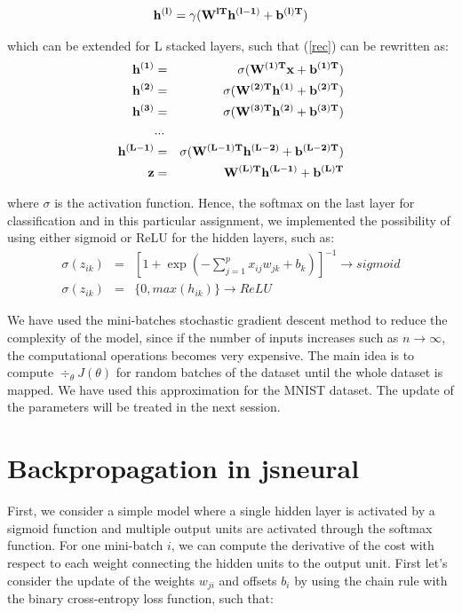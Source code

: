 \documentclass{article}
\begin{document}
\begin{eqnarray}
\bf{h}^{(l)} = \gamma(\bf{W}^{lT}\bf{h}^{(l-1)} + \bf{b}^{(l)T})
\label{rec}
\end{eqnarray}

which can be extended for L stacked layers, such that (\ref{rec}) can be rewritten as:
\begin{eqnarray}
\bf{h}^{(1)} &=& \sigma(\bf{W}^{(1)T}\bf{x} + \bf{b}^{(1)T}) \nonumber \\
\bf{h}^{(2)} &=& \sigma(\bf{W}^{(2)T}\bf{h}^{(1)} + \bf{b}^{(2)T}) \nonumber \\
\bf{h}^{(3)} &=& \sigma(\bf{W}^{(3)T}\bf{h}^{(2)} + \bf{b}^{(3)T}) \nonumber \\
&...& \nonumber \\
\bf{h}^{(L-1)} &=& \sigma(\bf{W}^{(L-1)T}\bf{h}^{(L-2)} + \bf{b}^{(L-2)T}) \nonumber \\
\bf{z}&=&\bf{W}^{(L)T}\bf{h}^{(L-1)} + \bf{b}^{(L)T} 
\end{eqnarray}

where $\sigma$ is the activation function. Hence, the softmax on the last layer for classification and in this particular assignment, we implemented the possibility of using either sigmoid or ReLU for the hidden layers, such as:
\begin{eqnarray}
\sigma(z_{ik}) &=& \left[1+\exp(-\sum_{j=1}^{p} x_{ij}w_{jk}  +b_k )\right]^{-1}\longrightarrow sigmoid \nonumber \\
\sigma(z_{ik}) &=& \{0,max(h_{ik})\} \longrightarrow ReLU 
\end{eqnarray}

We have used the mini-batches stochastic gradient descent method to reduce the complexity of the model, since if the number of inputs increases such as $n \rightarrow \infty$, the computational operations becomes very expensive. The main idea is to compute $\div_{\theta}J(\theta)$ for random batches of the dataset until the whole dataset is mapped. We have used this approximation for the MNIST dataset. The update of the parameters will be treated in the next session.

\section{Backpropagation in jsneural}

First, we consider a simple model where a single hidden layer is activated by a sigmoid function and multiple output units are activated through the softmax function. For one mini-batch $i$, we can compute the derivative of the cost with respect to each weight connecting the hidden units to the output unit. First let's consider the update of the weights $w_{ji}$ and offsets $b_i$ by using the chain rule with the binary cross-entropy loss function, such that:
\end{document}
